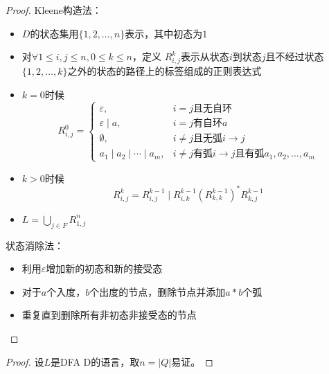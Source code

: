 \documentclass{article}
\begin{document}
\begin{proof}
Kleene构造法：
\begin{itemize}
    \item $D$的状态集用$\{1, 2, \dots, n\}$表示，其中初态为$1$
    \item 对$\forall 1 \leq i, j \leq n, 0 \leq k \leq n $，定义
    $R_{i,j}^k$表示从状态$i$到状态$j$且不经过状态$\{1, 2, \dots, k\}$之外的状态的路径上的标签组成的正则表达式
    \item $k = 0$时候
    \[
        R_{i,j}^0 = \begin{cases}
            \varepsilon, &i = j \text{且无自环}\\
            \varepsilon \mid a, &i = j \text{有自环}a\\
            \emptyset, &i \neq j \text{且无弧}i \to j\\
            a_1 \mid a_2 \mid \cdots \mid a_m, &i \neq j \text{有弧}i \to j\text{且有弧}a_1, a_2, \dots, a_m
        \end{cases}
    \]
    \item $k > 0$时候
    \[
        R_{i,j}^k = R_{i,j}^{k-1} \mid R_{i,k}^{k-1} (R_{k,k}^{k-1})^* R_{k,j}^{k-1}
    \]
    \item $L = \bigcup_{j \in F} R_{1,j}^n$
\end{itemize}
状态消除法：
\begin{itemize}
    \item 利用$\varepsilon$增加新的初态和新的接受态
    \item 对于$a$个入度，$b$个出度的节点，删除节点并添加$a*b$个弧
    \item 重复直到删除所有非初态非接受态的节点
\end{itemize}
\end{proof}

\begin{proof}
    设$L$是DFA D的语言，取$n = |Q|$易证。
\end{proof}
\end{document}
